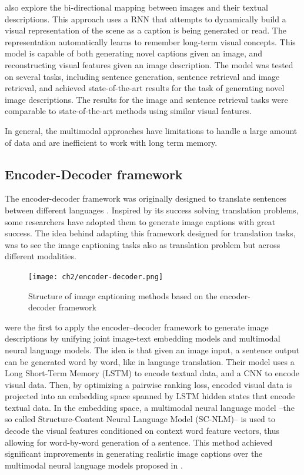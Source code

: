 \citet{Chen2015} also explore the bi-directional mapping between images and their textual descriptions. This approach uses a RNN that attempts to dynamically build a visual representation of the scene as a caption is being generated or read. The representation automatically learns to remember long-term visual concepts. This model is capable of both generating novel captions given an image, and reconstructing visual features given an image description. The model was tested on several tasks, including sentence generation, sentence retrieval and image retrieval, and achieved state-of-the-art results for the task of generating novel image descriptions. The results for the image and sentence retrieval tasks were comparable to state-of-the-art methods using similar visual features.

In general, the multimodal approaches have limitations to handle a large amount of data and are inefficient to work with long term memory.

\subsection{Encoder-Decoder framework}\label{sec:encoder-decoder_framework}

The encoder-decoder framework was originally designed to translate sentences between different languages \citep{Kalchbrenner2013, Sutskever2014, Cho2014}. Inspired by its success solving translation problems, some researchers have adopted them to generate image captions with great success. The idea behind adapting this framework designed for translation tasks, was to see the image captioning tasks also as translation problem but across different modalities. 

\begin{figure}[hpt]
	\centering
	\texttt{[image: ch2/encoder-decoder.png]}
	\caption{Structure of image captioning methods based on the encoder-decoder framework}
	\label{fig:encoder-decoder}
\end{figure}

\citet{Kiros2014b} were the first to apply the encoder–decoder framework to generate image descriptions by unifying joint image-text embedding models and multimodal neural language models. The idea is that given an image input, a sentence output can be generated word by word, like in language translation. Their model uses a Long Short-Term Memory (LSTM) \citep{Hochreiter1997} to encode textual data, and a CNN to encode visual data. Then, by optimizing a pairwise ranking loss, encoded visual data is projected into an embedding space spanned by LSTM  hidden states that encode textual data. In the embedding space, a multimodal neural language model --the so called Structure-Content Neural Language Model (SC-NLM)-- is used to decode the visual features conditioned on context word feature vectors, thus allowing for word-by-word generation of a sentence. This method achieved significant improvements in generating realistic image captions over the multimodal neural language models proposed in \citep{Kiros2014a}.

